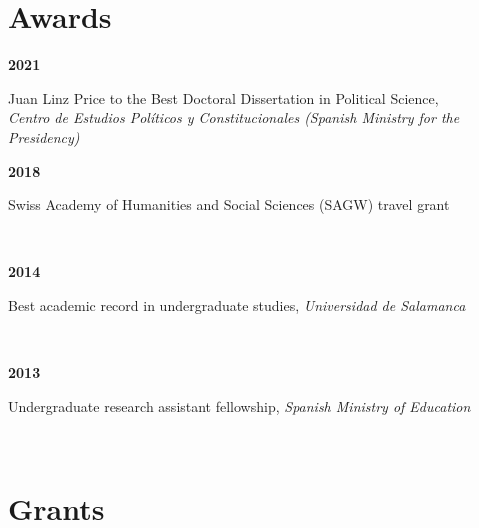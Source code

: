 \documentclass[a4paper, 12pt]{article}
\begin{document}
\section*{Awards}


\begin{minipage}[t]{0.1\textwidth}
\textbf{2021}
\end{minipage}\hfill\begin{minipage}[t]{0.9\textwidth}
Juan Linz Price to the Best Doctoral Dissertation in Political Science,\\\textit{Centro de Estudios Políticos y Constitucionales (Spanish Ministry for the Presidency)}\\\vspace{-8pt}
\end{minipage}
\begin{minipage}[t]{0.1\textwidth}
\textbf{2018}
\end{minipage}\hfill\begin{minipage}[t]{0.9\textwidth}
Swiss Academy of Humanities and Social Sciences (SAGW) travel grant
\end{minipage}\\
\begin{minipage}[t]{0.1\textwidth}
\textbf{2014}
\end{minipage}\hfill\begin{minipage}[t]{0.9\textwidth}
Best academic record in undergraduate studies, {\it Universidad de Salamanca}
\end{minipage}\\
\begin{minipage}[t]{0.1\textwidth}
\textbf{2013}
\end{minipage}\hfill\begin{minipage}[t]{0.9\textwidth}
Undergraduate research assistant fellowship, {\it Spanish Ministry of Education}
\end{minipage}\\

\section*{Grants}
\end{document}

